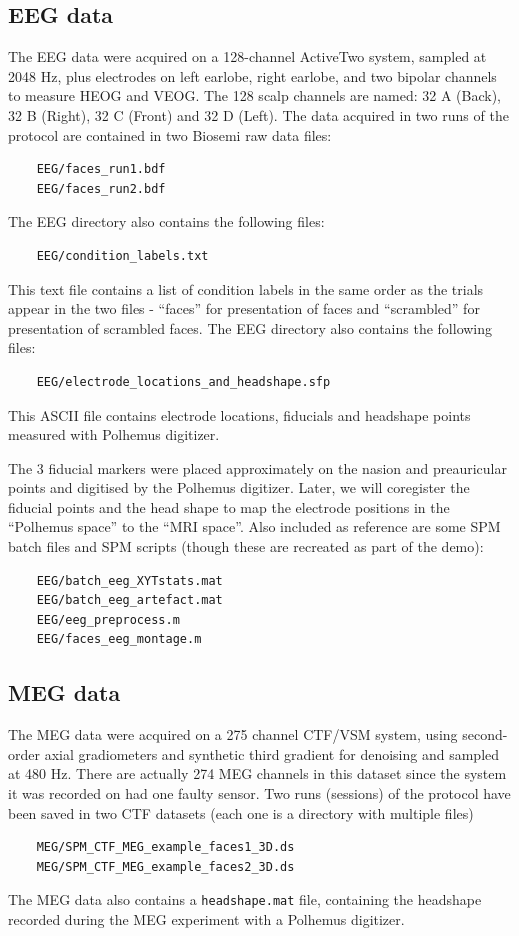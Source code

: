 \subsection{EEG data}

The EEG data were acquired on a 128-channel ActiveTwo system, sampled at 2048 Hz, plus electrodes on left earlobe, right earlobe, and two bipolar channels to measure HEOG and VEOG. The 128 scalp channels are named: 32 A (Back), 32 B (Right), 32 C (Front) and 32 D (Left). The data acquired in two runs of the protocol are contained in two Biosemi raw data files:
\begin{verbatim}
    EEG/faces_run1.bdf
    EEG/faces_run2.bdf
\end{verbatim}

The EEG directory also contains the following files:
\begin{verbatim}
    EEG/condition_labels.txt
\end{verbatim}
This text file contains a list of condition labels in the same order as the trials appear in the two files - ``faces'' for presentation of faces and ``scrambled'' for presentation of scrambled faces.
The EEG directory also contains the following files:
\begin{verbatim}
    EEG/electrode_locations_and_headshape.sfp
\end{verbatim}
This ASCII file contains electrode locations, fiducials and headshape points measured with Polhemus digitizer.

The 3 fiducial markers were placed approximately on the nasion and preauricular points and digitised by the Polhemus digitizer.  Later, we will coregister the fiducial points and the head shape to map the electrode positions in the ``Polhemus space'' to the ``MRI space''.
Also included as reference are some SPM batch files and SPM scripts (though these are recreated as part of the demo):

\begin{verbatim}
    EEG/batch_eeg_XYTstats.mat
    EEG/batch_eeg_artefact.mat
    EEG/eeg_preprocess.m
    EEG/faces_eeg_montage.m
\end{verbatim}


\subsection{MEG data}

The MEG data were acquired on a 275 channel CTF/VSM system, using second-order axial gradiometers and synthetic third gradient for denoising and sampled at 480 Hz. There are actually 274 MEG channels in this dataset since the system it was recorded on had one faulty sensor. Two runs (sessions) of the protocol have been saved in two CTF datasets (each one is a directory with multiple files) 
\begin{verbatim}
    MEG/SPM_CTF_MEG_example_faces1_3D.ds
    MEG/SPM_CTF_MEG_example_faces2_3D.ds
\end{verbatim}
The MEG data also contains a \texttt{headshape.mat} file, containing the headshape recorded during the MEG experiment with a Polhemus digitizer.

